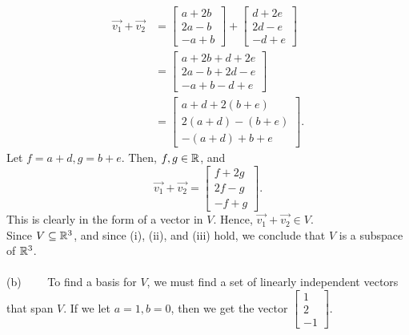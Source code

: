     \begin{align*}
        \vec{v_1} + \vec{v_2} & =
            \begin{bmatrix}
                a+2b \\
                2a-b \\
                -a+b
            \end{bmatrix} + 
            \begin{bmatrix}
                d+2e \\
                2d-e \\
                -d+e
        \end{bmatrix} \\
        & = \begin{bmatrix}
                a+2b+d+2e \\
                2a-b+2d-e \\
                -a+b-d+e
            \end{bmatrix} \\
        & = \begin{bmatrix}
                a+d+2(b+e) \\
                2(a+d)-(b+e) \\
                -(a+d)+b+e
            \end{bmatrix}.
    \end{align*}
    Let $f=a+d,g=b+e$. Then, $f,g \in \mathbb{R}$, and
    \begin{equation*}
        \vec{v_1}+\vec{v_2} =
            \begin{bmatrix}
                f+2g \\
                2f-g \\
                -f+g
            \end{bmatrix}.
    \end{equation*}
    This is clearly in the form of a vector in $V$. Hence, $\vec{v_1} + \vec{v_2} \in V$. \\
    Since $V \subseteq \mathbb{R}^3$, and since (i), (ii), and (iii) hold, we conclude that $V$ is a subspace of $\mathbb{R}^3$.
\\\\
    \indent (b) \ \ \ \ To find a basis for $V$, we must find a set of linearly independent vectors that span $V$. If we let $a=1,b=0$, then we get the vector 
        $\begin{bmatrix}
            1 \\
            2 \\
            -1
        \end{bmatrix}$.
